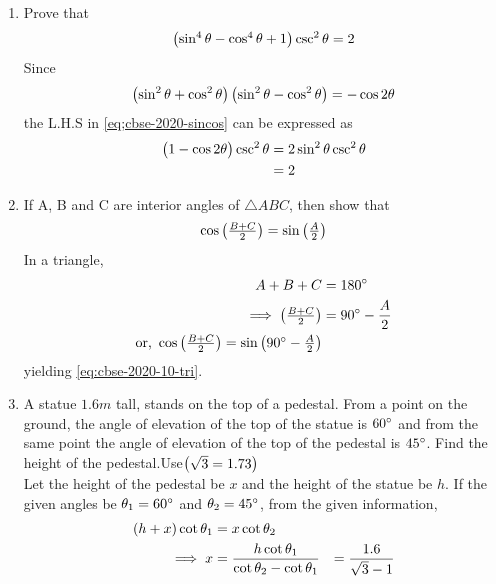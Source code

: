 \documentclass[journal,12pt,twocolumn]{IEEEtran}
\begin{document}
\begin{enumerate}
    \item Prove that
	    \begin{align}
		    \label{eq;cbse-2020-sincos}
    \begin{pmatrix}\sin^4\theta  - \cos^4\theta + 1\end{pmatrix} \csc^2\theta = 2
		    \end{align}
    \solution Since 
	    \begin{align}
\left(\sin^2\theta  + \cos^2\theta \right)
\left(\sin^2\theta  - \cos^2\theta \right)
= -\cos 2 \theta
		    \end{align}
		    the L.H.S in 
		    \eqref{eq;cbse-2020-sincos}
		    can be expressed as 
	    \begin{align}
		    \label{eq;cbse-2020-sincos_simp}
		    \begin{pmatrix}1-\cos2\theta\end{pmatrix} \csc^2\theta &= 
2 \sin^2 \theta \csc^2\theta 
\\
		    &= 2
		    \end{align}
    
      
     
    
    
    \item If A, B and C are interior angles of $\triangle ABC$, then show that
		    \begin{align}
			    \label{eq:cbse-2020-10-tri}
    \cos \begin{pmatrix}\frac{B + C}{2}\end{pmatrix} = \sin \begin{pmatrix}\frac{A}{2}\end{pmatrix}
		    \end{align}
		    \solution In a triangle,
		    \begin{align}
			    A+B+C &= 180\degree
			    \\
			    \implies \begin{pmatrix}\frac{B + C}{2}\end{pmatrix} &= 90\degree-\frac{A}{2}
			    \\
			    \text{or, }    \cos \begin{pmatrix}\frac{B + C}{2}\end{pmatrix} = \sin \begin{pmatrix}90\degree -\frac{A}{2}\end{pmatrix}
		    \end{align}
			    yielding \eqref{eq:cbse-2020-10-tri}.

    \item A statue $1.6m$ tall, stands on the top of a pedestal. From a point on the ground,  the angle of elevation of the top of the statue is $60\degree$ and from the same point the angle of elevation of the top of the pedestal is $45\degree$. Find the height of the pedestal.Use$\begin{pmatrix}\sqrt{3} = 1.73\end{pmatrix}$\\
	    \solution Let the height of the pedestal be $x$ and the height of the statue be $h$. If the given angles be $\theta_1 = 60 \degree$ and $\theta_2 = 45 \degree$,  from the given information, 
\begin{align}
	\left(h + x \right)\cot \theta_1 &= x \cot \theta_2
	\\
	\implies x &= \frac{h\cot \theta_1}{\cot \theta_2-\cot \theta_1}
	&= \frac{1.6}{\sqrt{3}-1}
\end{align}
	    

    
    \end{enumerate}
\end{document}
